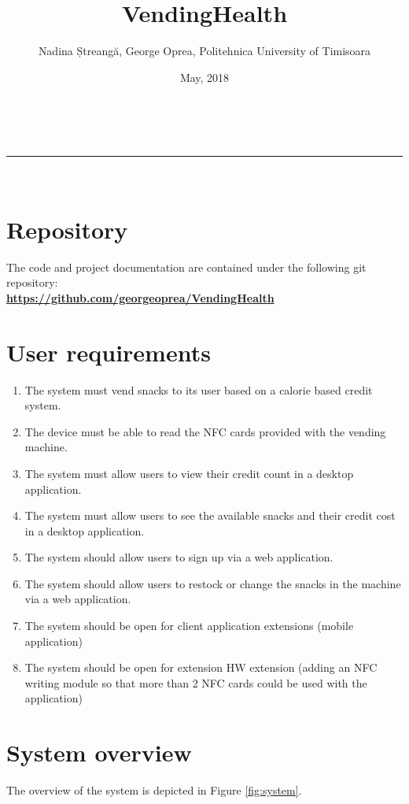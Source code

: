 \documentclass[a4paper,11pt]{article}
\makeatletter
\newcommand{\divider}{\rule{\linewidth}{0.5pt}}
\renewcommand{\maketitle}{
\begin{center}
\vspace{2ex}
{\huge \textsc{\@title}}
\vspace{1ex}
\\
\divider\\
\@author \hfill \@date
\vspace{4ex}
\end{center}
}
\makeatother
\begin{document}
\title{VendingHealth}

\author{Nadina Ștreangă, George Oprea, Politehnica University of Timisoara}

\date{May, 2018}

\maketitle

\section{Repository}
The code and project documentation are contained under the following git repository:\\
\textbf{\url{https://github.com/georgeoprea/VendingHealth}}

\section{User requirements}

\begin{enumerate}
\item The system must vend snacks to its user based on a calorie based credit system.
\item The device must be able to read the NFC cards provided with the vending machine.
\item The system must allow users to view their credit count in a desktop application.
\item The system must allow users to see the available snacks and their credit cost in a 
desktop application.
\item The system should allow users to sign up via a web application.
\item The system should allow users to restock or change the snacks in the machine 
via a web application.
\item The system should be open for client application extensions (mobile application)
\item The system should be open for extension HW extension (adding an NFC writing module
so that more than 2 NFC cards could be used with the application)
\end{enumerate}

\section{System overview}
The overview of the system is depicted in Figure \ref{fig:system}.\\
\end{document}
